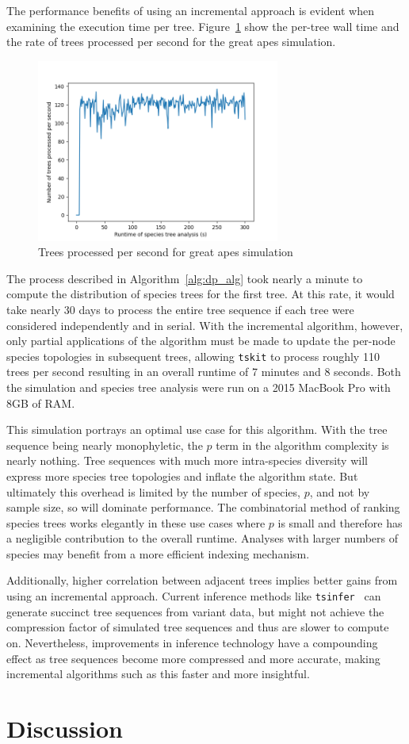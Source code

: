 \documentclass{article}
\newcommand{\tskit}{{\texttt{tskit}}}
\newcommand{\tsinfer}{{\texttt{tsinfer}}}
\begin{document}
The performance benefits of using an incremental approach is evident when
examining the execution time per tree. Figure~\ref{fig:incremental_times}
show the per-tree wall time and the rate of trees processed per second
for the great apes simulation.
\begin{figure}[H]
    \includegraphics[height=6cm]{trees_per_sec.png}
    \centering
    \caption{Trees processed per second for great apes simulation}\label{fig:incremental_times}
\end{figure}

The process described in Algorithm~\ref{alg:dp_alg}
took nearly a minute to compute the distribution of species trees for the first tree.
At this rate, it would take nearly 30 days to process the entire tree sequence if
each tree were considered independently and in serial.
With the incremental algorithm, however, only partial applications of the algorithm
must be made to update the per-node species topologies in subsequent trees, allowing
\tskit{} to process roughly 110 trees per second resulting in an overall
runtime of 7 minutes and 8 seconds. Both the simulation and species tree analysis
were run on a 2015 MacBook Pro with 8GB of RAM.

This simulation portrays an optimal use case for this algorithm. With the tree
sequence being nearly monophyletic, the $p$ term in the algorithm complexity is
nearly nothing. Tree sequences with much more intra-species diversity will express
more species tree topologies and inflate the algorithm state. But ultimately this
overhead is limited by the number of species, $p$, and not by sample size, so will
dominate performance. The combinatorial method of ranking
species trees works elegantly in these use cases where $p$ is small and therefore has
a negligible contribution to the overall runtime. Analyses with larger numbers of
species may benefit from a more efficient indexing mechanism.

Additionally, higher correlation between adjacent trees implies
better gains from using an incremental approach. Current inference methods
like \tsinfer{}~\citep{tsinfer} can generate succinct tree sequences from variant data,
but might not achieve the compression factor of simulated tree sequences and thus
are slower to compute on. Nevertheless, improvements in inference technology have
a compounding effect as tree sequences become more compressed and more accurate,
making incremental algorithms such as this faster and more insightful.

\section{Discussion}




\end{document}
